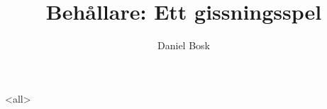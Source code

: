 \documentclass[ignoreframetext]{beamer}
\begin{document}
\title{%
  Behållare: Ett gissningsspel
}
\author{Daniel Bosk}

\begin{frame}
  \maketitle
\end{frame}

\mode<all>

\mode*
%

\end{document}
